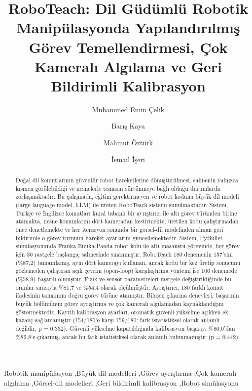 \documentclass[preprint,12pt]{elsarticle}
\begin{document}
\begin{frontmatter}

\title{RoboTeach: Dil Güdümlü Robotik Manipülasyonda Yapılandırılmış Görev Temellendirmesi, Çok Kameralı Algılama ve Geri Bildirimli Kalibrasyon}

\author[omu]{Muhammed Emin \c{C}elik}
\author[omu]{Bar\i\c{s} Kaya}
\author[omu]{Mahmut \"{O}zt\"{u}rk}
\author[omu]{\.{I}smail \.{I}\c{s}eri}

\address[omu]{Bilgisayar M\"{u}hendisli\u{g}i B\"{o}l\"{u}m\"{u}, Ondokuz May\i s \"{U}niversitesi, Samsun, T\"{u}rkiye}

\begin{abstract}
Doğal dil komutlarının güvenilir robot hareketlerine dönüştürülmesi, sahnenin yalnızca kısmen görülebildiği ve nesnelerle temasın sürtünmeye bağlı olduğu durumlarda zorlaşmaktadır. Bu çalışmada, eğitim gerektirmeyen ve robot kodunu büyük dil modeli (large language model, LLM) ile üreten RoboTeach sistemi sunulmaktadır. Sistem, Türkçe ve İngilizce komutları kural tabanlı bir ayrıştırıcı ile altı görev türünden birine atamakta, nesne konumlarını dört kameradan kestirmekte, üretilen kodu çalıştırmadan önce denetlemekte ve her iterasyon sonunda bir görsel-dil modelinden alınan geri bildirimle o görev türünün hareket ayarlarını güncellemektedir. Sistem, PyBullet simülasyonunda Franka Emika Panda robot kolu ile altı masaüstü görevinde, her görev için 30 rastgele başlangıç sahnesinde sınanmıştır. RoboTeach 180 denemenin 157'sini (\%87,2) tamamlamış, aynı dört kamerayı kullanan, ancak kodu bir kez üretip sonucunu gözlemeden çalıştıran açık çevrim (open-loop) karşılaştırma yöntemi ise 106 denemede (\%58,9) başarılı olmuştur. Fizik ve sensör parametreleri rastgele değiştirildiğinde bu oranlar sırasıyla \%81,7 ve \%54,4 olarak ölçülmüştür. Ayrıştırıcı, 180 farklı komut ifadesinin tamamını doğru görev türüne atamıştır. Bileşen çıkarma deneyleri, başarının büyük bölümünün görev ayrıştırma ve çok kameralı algılamadan kaynaklandığını göstermektedir. Kayıtlı kalibrasyon ayarları, otomatik güvenli yükselme açıkken ek kazanç sağlamamıştır (154/180'e karşı 159/180; fark istatistiksel olarak anlamlı değildir, p = 0,332). Güvenli yükselme kapatıldığında kalibrasyon başarıyı \%80,0'dan \%82,8'e çıkarmış, ancak bu fark istatistiksel olarak anlamlı bulunmamıştır (p = 0,442).
\end{abstract}

\begin{keyword}
Robotik manipülasyon \sep Büyük dil modelleri \sep Görev ayrıştırma \sep Çok kameralı algılama \sep Görsel-dil modelleri \sep Geri bildirimli kalibrasyon \sep Robot simülasyonu
\end{keyword}

\end{frontmatter}
\end{document}
